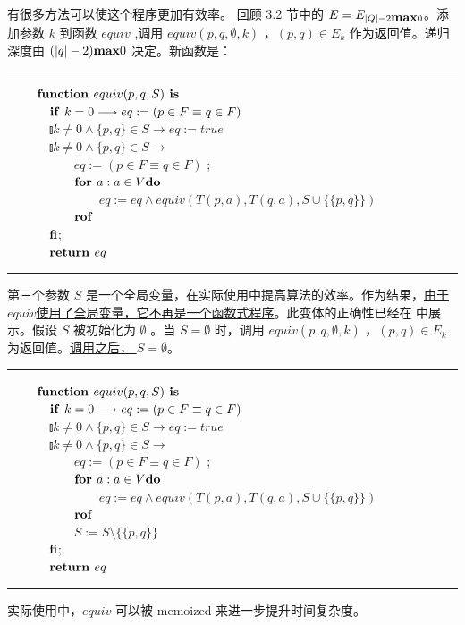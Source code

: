 有很多方法可以使这个程序更加有效率。 回顾 3.2 节中的 $ E = E_{ |Q|-2 \mbox{\textbf{max}} 0 } $。添加参数 $k$ 到函数 $equiv$ ,调用 $equiv(p,q,\emptyset,k)$ ，$ (p,q) \in E_k $ 作为返回值。递归深度由 $ (|q|-2) \mbox{\textbf{max}} 0 $ 决定。新函数是：
\newline
\rule{\textwidth}{1pt}
\mbox{　　} $\mbox{\textbf{function }} equiv (p,q,S) \mbox{\textbf{ is }}$ \\
\mbox{　　　} $ \mbox{\textbf{if }} k=0 \longrightarrow eq := ( p \in F \equiv q \in F ) $ \\
\mbox{　　　} $ \talloblong k\not= 0 \land \{ p,q \} \in S \longrightarrow eq := true $ \\
\mbox{　　　} $ \talloblong k\not= 0 \land \{ p,q \} \in S \longrightarrow $ \\
\mbox{　　　　　} $ eq := ( p \in F \equiv q \in F ) $ ; \\
\mbox{　　　　　} $ \mbox{\textbf{for }} a:a \in V \mbox{\textbf{do}} $ \\
\mbox{　　　　　　　} $ eq := eq \land equiv (T(p,a),T(q,a),S \cup \{ \{ p,q\} \}  )   $ \\
\mbox{　　　　　} $ \mbox{\textbf{rof}} $\\
\mbox{　　　} $\mbox{\textbf{fi}}$; \\
\mbox{　　　} $\mbox{\textbf{return }} eq$ \\
\rule{\textwidth}{1pt}
第三个参数 $S$ 是一个全局变量，在实际使用中提高算法的效率。作为结果，\underline{由于$equiv$使用了全局变量，它不再是一个函数式程序}。此变体的正确性已经在 \cite{t-Ei91} 中展示。假设 $S$ 被初始化为 $\emptyset$ 。当 $ S =\emptyset $ 时，调用 $equiv(p,q,\emptyset,k)$ ，$ (p,q) \in E_k $ 为返回值。\underline{调用之后， $S = \emptyset$}。
\newline
{}
\\
\rule{\textwidth}{1pt}
\mbox{　　} $\mbox{\textbf{function }} equiv (p,q,S) \mbox{\textbf{ is }}$ \\
\mbox{　　　} $ \mbox{\textbf{if }} k=0 \longrightarrow eq := ( p \in F \equiv q \in F ) $ \\
\mbox{　　　} $ \talloblong k\not= 0 \land \{ p,q \} \in S \longrightarrow eq := true $ \\
\mbox{　　　} $ \talloblong k\not= 0 \land \{ p,q \} \in S \longrightarrow $ \\
\mbox{　　　　　} $ eq := ( p \in F \equiv q \in F ) $ ; \\
\mbox{　　　　　} $ \mbox{\textbf{for }} a:a \in V \mbox{\textbf{do}} $ \\
\mbox{　　　　　　　} $ eq := eq \land equiv (T(p,a),T(q,a),S \cup \{ \{ p,q\} \}  )   $ \\
\mbox{　　　　　} $ \mbox{\textbf{rof}} $\\
\mbox{　　　　　} $ S := S \setminus \{ \{ p,q \} \} $ \\
\mbox{　　　} $\mbox{\textbf{fi}}$; \\
\mbox{　　　} $\mbox{\textbf{return }} eq$ \\
\rule{\textwidth}{1pt}
实际使用中，$equiv$ 可以被 memoized 来进一步提升时间复杂度。

